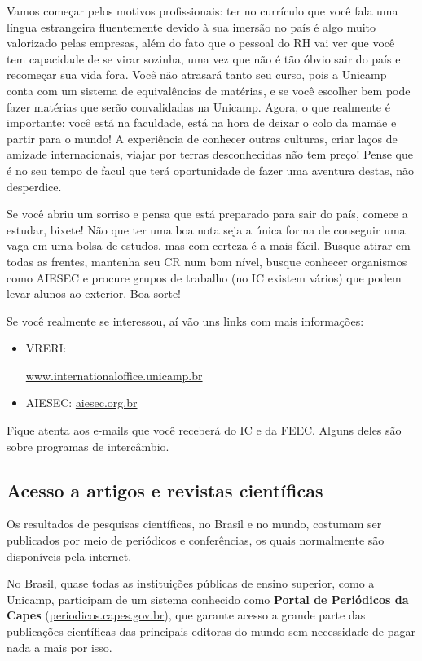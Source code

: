 Vamos começar pelos motivos profissionais: ter no currículo que você fala uma
língua estrangeira fluentemente devido à sua imersão no país é algo muito
valorizado pelas empresas, além do fato que o pessoal do RH vai ver que você
tem capacidade de se virar sozinha, uma vez que não é tão óbvio sair do país e
recomeçar sua vida fora. Você não atrasará tanto seu curso, pois a Unicamp
conta com um sistema de equivalências de matérias, e se você escolher bem pode
fazer matérias que serão convalidadas na Unicamp. Agora, o que realmente é
importante: você está na faculdade, está na hora de deixar o colo da mamãe e
partir para o mundo! A experiência de conhecer outras culturas, criar laços de
amizade internacionais, viajar por terras desconhecidas não tem preço! Pense
que é no seu tempo de facul que terá oportunidade de fazer uma aventura destas,
não desperdice.

Se você abriu um sorriso e pensa que está preparado para sair do país, comece a
estudar, bixete! Não que ter uma boa nota seja a única forma de conseguir uma
vaga em uma bolsa de estudos, mas com certeza é a mais fácil. Busque atirar em
todas as frentes, mantenha seu CR num bom nível, busque conhecer organismos
como AIESEC e procure grupos de trabalho (no IC existem vários) que podem levar
alunos ao exterior. Boa sorte!

Se você realmente se interessou, aí vão uns links com mais informações:

\begin{itemize}
\item VRERI:
  \begin{small}
  \url{www.internationaloffice.unicamp.br}
  \end{small}
\item AIESEC: \url{aiesec.org.br}
\end{itemize}

Fique atenta aos e-mails que você receberá do IC e da FEEC. Alguns deles são
sobre programas de intercâmbio.

\subsection{Acesso a artigos e revistas científicas}

Os resultados de pesquisas científicas, no Brasil e no mundo, costumam ser
publicados por meio de periódicos e conferências, os quais normalmente são
disponíveis pela internet.

No Brasil, quase todas as instituições públicas de ensino superior, como a
Unicamp, participam de um sistema conhecido como \textbf{Portal de Periódicos
da Capes} (\url{periodicos.capes.gov.br}), que garante acesso a grande parte
das publicações científicas das principais editoras do mundo sem necessidade de
pagar nada a mais por isso.

